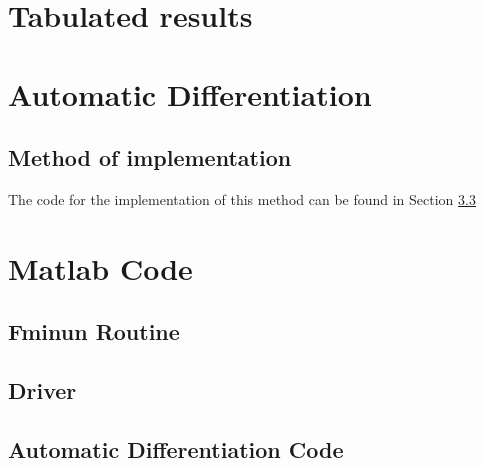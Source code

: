 \documentclass{article}
\begin{document}
\section{Tabulated results}

\section{Automatic Differentiation}
\subsection{Method of implementation}
The code for the implementation of this method can be found in Section \ref{ADcode}

%

\section{Matlab Code}

\subsection{Fminun Routine}
\subsection{Driver}
\subsection{Automatic Differentiation Code}\label{ADcode}


\end{document}
